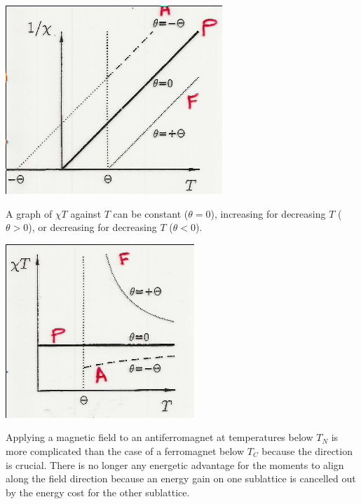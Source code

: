 \documentclass[a4paper, 11pt, normalem]{report}
\begin{document}
\begin{center}
    \includegraphics[scale=0.5]{straightcw.png}
\end{center}
A graph of $\chi T$ against $T$ can be constant ($\theta=0$), increasing for decreasing $T$ ($\theta > 0$), or decreasing for decreasing $T$ ($\theta <0$).
\begin{center}
    \includegraphics[scale=0.5]{chaitea.png}
\end{center}
Applying a magnetic field to an antiferromagnet at temperatures below $T_N$ is more complicated than the case of a ferromagnet below $T_C$ because the direction is crucial. 
There is no longer any energetic advantage for the moments to align along the field direction because an energy gain on one sublattice is cancelled out by the energy cost for the other sublattice. 
\end{document}
